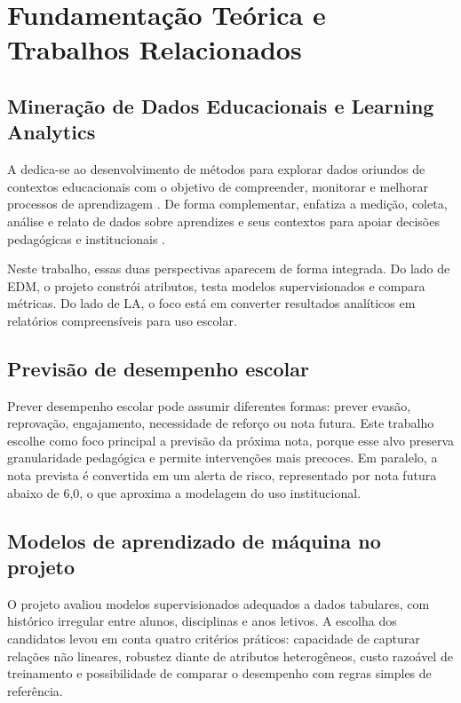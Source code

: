 \chapter{Fundamenta\c{c}\~ao Te\'orica e Trabalhos Relacionados}
\label{cap:referencial}

\section{Minera\c{c}\~ao de Dados Educacionais e Learning Analytics}
\label{sec:edm-la}

A  dedica-se ao desenvolvimento de m\'etodos para explorar dados oriundos de contextos educacionais com o objetivo de compreender, monitorar e melhorar processos de aprendizagem \cite{romero2010, handbookedm}. De forma complementar,  enfatiza a medi\c{c}\~ao, coleta, an\'alise e relato de dados sobre aprendizes e seus contextos para apoiar decis\~oes pedag\'ogicas e institucionais \cite{siemens2012, baker2014}.

Neste trabalho, essas duas perspectivas aparecem de forma integrada. Do lado de EDM, o projeto constr\'oi atributos, testa modelos supervisionados e compara m\'etricas. Do lado de LA, o foco est\'a em converter resultados anal\'iticos em relat\'orios compreens\'iveis para uso escolar.

\section{Previs\~ao de desempenho escolar}
\label{sec:previsao-desempenho}

Prever desempenho escolar pode assumir diferentes formas: prever evas\~ao, reprova\c{c}\~ao, engajamento, necessidade de refor\c{c}o ou nota futura. Este trabalho escolhe como foco principal a previs\~ao da pr\'oxima nota, porque esse alvo preserva granularidade pedag\'ogica e permite interven\c{c}\~oes mais precoces. Em paralelo, a nota prevista \'e convertida em um alerta de risco, representado por nota futura abaixo de 6,0, o que aproxima a modelagem do uso institucional.

\section{Modelos de aprendizado de m\'aquina no projeto}
\label{sec:modelos}

O projeto avaliou modelos supervisionados adequados a dados tabulares, com hist\'orico irregular entre alunos, disciplinas e anos letivos. A escolha dos candidatos levou em conta quatro crit\'erios pr\'aticos: capacidade de capturar rela\c{c}\~oes n\~ao lineares, robustez diante de atributos heterog\^eneos, custo razo\'avel de treinamento e possibilidade de comparar o desempenho com regras simples de refer\^encia.

